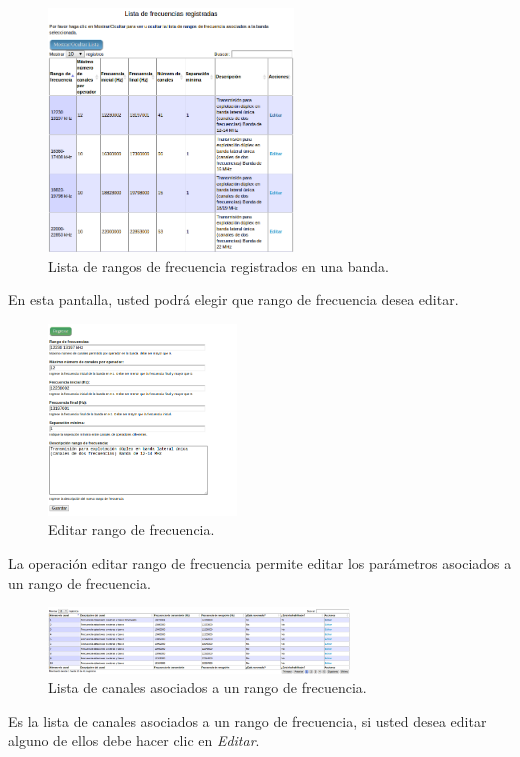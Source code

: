 \begin{multicols}{2}
\begin{figure}[H]
	\centering
	\includegraphics[width=6.5cm]{Anexos/Imagenes/ManualUsuario/FrecuenciasRegistradas.png}
	\caption{ Lista de rangos de frecuencia registrados en una banda.}
\end{figure}

En esta pantalla, usted podrá elegir que rango de frecuencia desea editar.

\begin{figure}[H]
	\centering
	\includegraphics[width=5cm]{Anexos/Imagenes/ManualUsuario/EditarRangoFrecuencia.png}
	\caption{ Editar rango de frecuencia.}
\end{figure}

La operación editar rango de frecuencia permite editar los parámetros asociados a un rango de frecuencia.

\begin{figure}[H]
	\centering
	\includegraphics[width=8cm]{Anexos/Imagenes/ManualUsuario/Canales.png}
	\caption{ Lista de canales asociados a un rango de frecuencia.}
\end{figure}

Es la lista de canales asociados a un rango de frecuencia, si usted desea editar alguno de ellos debe hacer clic en \textit{Editar}.


\end{multicols}
